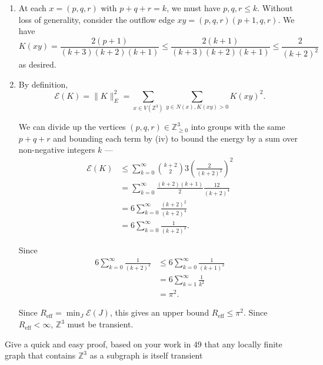 \documentclass[12 pt, letterpaper]{hmcpset}
\begin{document}
\begin{solution}
\begin{enumerate}
			The number of $(p, q, r) \in \mathbb{Z}^{3}_{\ge 0}$ with $p + q + r = k$ is just the number of ways to place two bars to divide $k$ stars into $3$ groups. Thus, there are $\binom{k + 2}{2}$ of them.

		\item At each $x = (p, q, r)$ with $p + q + r = k$, we must have $p, q, r \le k$. Without loss of generality, consider the outflow edge $xy = (p, q, r)(p + 1, q, r)$. We have
			\[
				K(xy) = \frac{2 (p + 1)}{(k + 3)(k + 2)(k + 1)} \le \frac{2 (k + 1)}{(k + 3)(k + 2)(k + 1)} \le \frac{2}{(k + 2)^{2}}
			\]
			as desired.

		\item By definition,
			\[
				\mathcal{E}(K) = \lVert K \rVert^{2}_{E} = \sum_{x \in V(\mathbb{Z}^{3})} \sum_{y \in N(x), K(xy) > 0} K(xy)^{2}.
			\]

			We can divide up the vertices $(p, q, r) \in \mathbb{Z}_{\ge 0}^{3}$ into groups with the same $p + q + r$ and bounding each term by (iv) to bound the energy by a sum over non-negative integers $k$ ---
			\begin{align*}
				\mathcal{E}(K) & \le \sum_{k = 0}^{\infty} \binom{k + 2}{2} 3 \left ( \frac{2}{(k + 2)^{2}} \right )^{2} \\
					       & = \sum_{k = 0}^{\infty} \frac{(k + 2)(k + 1)}{2} \frac{12}{(k + 2)^{4}} \\
					       & = 6 \sum_{k = 0}^{\infty} \frac{(k + 2)^{2}}{(k + 2)^{4}} \\
					       & = 6 \sum_{k = 0}^{\infty} \frac{1}{(k + 2)^{2}}.
			\end{align*}

			Since
			\begin{align*}
				6 \sum_{k = 0}^{\infty} \frac{1}{(k + 2)^{2}} & \le 6 \sum_{k = 0}^{\infty} \frac{1}{(k + 1)^{2}} \\
									      & = 6 \sum_{k = 1}^{\infty} \frac{1}{k^{2}} \\
									      & = \pi^{2}.
			\end{align*}

			Since $R_{\text{eff}} = \min_{J} \mathcal{E}(J)$, this gives an upper bound $R_{\text{eff}} \le \pi^{2}$. Since $R_{\text{eff}} < \infty$, $\mathbb{Z}^{3}$ must be transient.
	\end{enumerate}
\end{solution}

\pagebreak

\begin{problem}[50.]
	Give a quick and easy proof, based on your work in 49 that any locally finite graph that contains $\mathbb{Z}^{3}$ as a subgraph is itself transient
\end{problem}
\end{document}
